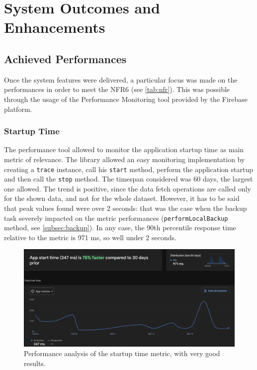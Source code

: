 \section{System Outcomes and Enhancements}

\subsection{Achieved Performances}
Once the system features were delivered, a particular focus was made on the performances in order to meet the NFR6 (see \cref{tab:nfr}). This was possible through the usage of the Performance Monitoring tool provided by the Firebase platform.
\subsubsection{Startup Time}
The performance tool allowed to monitor the application startup time as main metric of relevance. The library allowed an easy monitoring implementation by creating a \texttt{trace} instance, call his \texttt{start} method, perform the application startup and then call the \texttt{stop} method. The timespan considered was 60 days, the largest one allowed. The trend is positive, since the data fetch operations are called only for the shown data, and not for the whole dataset. However, it has to be said that peak values found were over 2 seconds: that was the case when the backup task severely impacted on the metric performances (\texttt{performLocalBackup} method, see \cref{subsec:backup}). In any case, the 90th percentile response time relative to the metric is 971 ms, so well under 2 seconds.

\begin{figure}
    \includegraphics[width=1.0\linewidth]{./images/performance.png}
    \caption{Performance analysis of the startup time metric, with very good results.}
\end{figure}
\newpage
